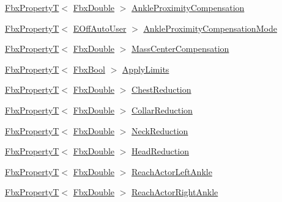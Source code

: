 \begin{DoxyCompactItemize}
\item 
\hyperlink{class_fbx_property_t}{Fbx\+PropertyT}$<$ \hyperlink{fbxtypes_8h_a171e72a1c46fc15c1a6c9c31948c1c5b}{Fbx\+Double} $>$ \hyperlink{class_fbx_character_aa1d39ce9313df0fe4b472c446e66225c}{Ankle\+Proximity\+Compensation}
\item 
\hyperlink{class_fbx_property_t}{Fbx\+PropertyT}$<$ \hyperlink{class_fbx_character_ab698a180e6f900ba8317257749c2ecce}{E\+Off\+Auto\+User} $>$ \hyperlink{class_fbx_character_a13fbced2f7ec82a05ec62aa84bc9b686}{Ankle\+Proximity\+Compensation\+Mode}
\item 
\hyperlink{class_fbx_property_t}{Fbx\+PropertyT}$<$ \hyperlink{fbxtypes_8h_a171e72a1c46fc15c1a6c9c31948c1c5b}{Fbx\+Double} $>$ \hyperlink{class_fbx_character_ac19cd028c848d564b39a0b5d1986f8d8}{Mass\+Center\+Compensation}
\item 
\hyperlink{class_fbx_property_t}{Fbx\+PropertyT}$<$ \hyperlink{fbxtypes_8h_a92e0562b2fe33e76a242f498b362262e}{Fbx\+Bool} $>$ \hyperlink{class_fbx_character_ac65d1b275b0ad4ff6f53750d87c5fb97}{Apply\+Limits}
\item 
\hyperlink{class_fbx_property_t}{Fbx\+PropertyT}$<$ \hyperlink{fbxtypes_8h_a171e72a1c46fc15c1a6c9c31948c1c5b}{Fbx\+Double} $>$ \hyperlink{class_fbx_character_af9b963a8d92ba9c5e7a67ff3afdcf7df}{Chest\+Reduction}
\item 
\hyperlink{class_fbx_property_t}{Fbx\+PropertyT}$<$ \hyperlink{fbxtypes_8h_a171e72a1c46fc15c1a6c9c31948c1c5b}{Fbx\+Double} $>$ \hyperlink{class_fbx_character_ac3906f09d97af9fea25de19b1faab968}{Collar\+Reduction}
\item 
\hyperlink{class_fbx_property_t}{Fbx\+PropertyT}$<$ \hyperlink{fbxtypes_8h_a171e72a1c46fc15c1a6c9c31948c1c5b}{Fbx\+Double} $>$ \hyperlink{class_fbx_character_ab058db9f793bd106a1756ce4ec794bc9}{Neck\+Reduction}
\item 
\hyperlink{class_fbx_property_t}{Fbx\+PropertyT}$<$ \hyperlink{fbxtypes_8h_a171e72a1c46fc15c1a6c9c31948c1c5b}{Fbx\+Double} $>$ \hyperlink{class_fbx_character_a3261e15fba332932c44dca19271d7949}{Head\+Reduction}
\item 
\hyperlink{class_fbx_property_t}{Fbx\+PropertyT}$<$ \hyperlink{fbxtypes_8h_a171e72a1c46fc15c1a6c9c31948c1c5b}{Fbx\+Double} $>$ \hyperlink{class_fbx_character_aab13b47ce65203d4416c0d33784effe3}{Reach\+Actor\+Left\+Ankle}
\item 
\hyperlink{class_fbx_property_t}{Fbx\+PropertyT}$<$ \hyperlink{fbxtypes_8h_a171e72a1c46fc15c1a6c9c31948c1c5b}{Fbx\+Double} $>$ \hyperlink{class_fbx_character_abab10ebadfb1879a264e48dccd429874}{Reach\+Actor\+Right\+Ankle}

\end{DoxyCompactItemize}
